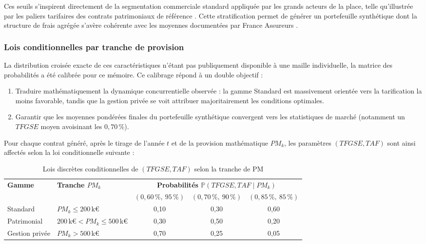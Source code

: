 Ces seuils s'inspirent directement de la segmentation commerciale standard appliquée par les grands acteurs de la place, telle qu'illustrée par les paliers tarifaires des contrats patrimoniaux de référence \cite{cgs_cachemire}. Cette stratification permet de générer un portefeuille synthétique dont la structure de frais agrégée s'avère cohérente avec les moyennes documentées par France Assureurs \cite{faUC2024}.

\subsubsection*{Lois conditionnelles par tranche de provision}

La distribution croisée exacte de ces caractéristiques n'étant pas publiquement disponible à une maille individuelle, la matrice des probabilités a été calibrée pour ce mémoire. Ce calibrage répond à un double objectif :
\begin{enumerate}
  \item Traduire mathématiquement la dynamique concurrentielle observée : la gamme Standard est massivement orientée vers la tarification la moins favorable, tandis que la gestion privée se voit attribuer majoritairement les conditions optimales.
  \item Garantir que les moyennes pondérées finales du portefeuille synthétique convergent vers les statistiques de marché (notamment un $TFGSE$ moyen avoisinant les $0{,}70\,\%$).
\end{enumerate}

Pour chaque contrat généré, après le tirage de l'année $t$ et de la provision mathématique $PM_k$, les paramètres $(TFGSE, TAF)$ sont ainsi affectés selon la loi conditionnelle suivante :

\begin{table}[H]
\centering
\caption{Lois discrètes conditionnelles de $(TFGSE, TAF)$ selon la tranche de PM}
\label{tab:TFGSE_TAF_PM}
\begin{tabular}{ll|ccc}
  \toprule
  \multirow{2}{*}{\textbf{Gamme}} & \multirow{2}{*}{\textbf{Tranche $PM_k$}} &
    \multicolumn{3}{c}{\textbf{Probabilités $\mathbb{P}(TFGSE, TAF \mid PM_k)$}} \\
  & & $(0{,}60\,\%,\ 95\,\%)$ & $(0{,}70\,\%,\ 90\,\%)$ & $(0{,}85\,\%,\ 85\,\%)$ \\
  \midrule
  Standard & $PM_k \leq 200$\,k\euro & 0,10 & 0,30 & 0,60 \\
  Patrimonial & $200$\,k\euro $< PM_k \leq 500$\,k\euro & 0,30 & 0,50 & 0,20 \\
  Gestion privée & $PM_k > 500$\,k\euro & 0,70 & 0,25 & 0,05 \\
  \bottomrule
\end{tabular}
\end{table}

